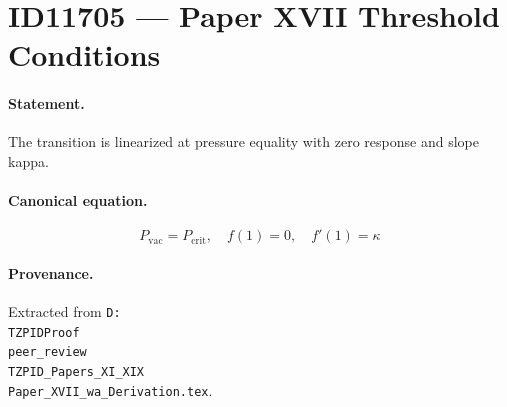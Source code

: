 \section*{ID11705 --- Paper XVII Threshold Conditions}

\paragraph{Statement.}
The transition is linearized at pressure equality with zero response and slope kappa.

\paragraph{Canonical equation.}
\[
P_{\mathrm{vac}}=P_{\mathrm{crit}},\quad f(1)=0,\quad f'(1)=\kappa
\]

\paragraph{Provenance.}
Extracted from \texttt{D:\\TZPIDProof\\peer\_review\\TZPID\_Papers\_XI\_XIX\\Paper\_XVII\_wa\_Derivation.tex}.
